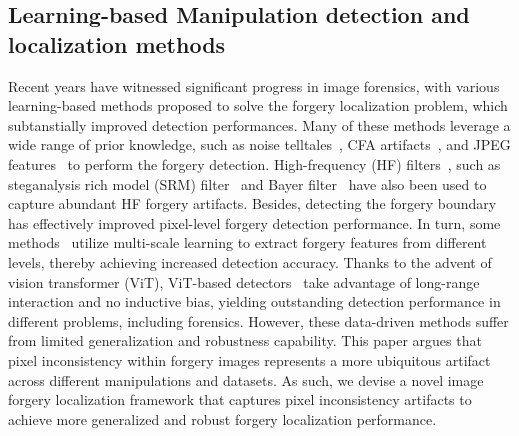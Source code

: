 \documentclass[10pt,journal,compsoc]{IEEEtran}
\begin{document}
\subsection{Learning-based Manipulation detection and localization methods}
Recent years have witnessed significant progress in image forensics, with various learning-based methods proposed to solve the forgery localization problem, which subtanstially improved detection performances. Many of these methods leverage a wide range of prior knowledge, such as noise telltales~\cite{cozzolino2019noiseprint, guillaro2022trufor, zhou2018learning}, CFA artifacts~\cite{bammey2020adaptive}, and JPEG features~\cite{kwon2022learning, rao2022towards, wang2022jpeg} to perform the forgery detection. High-frequency (HF) filters~\cite{zhuo2022self, li2019localization}, such as steganalysis rich
model (SRM) filter~\cite{zhou2018learning, wu2019mantra} and Bayer filter~\cite{dong2022mvss, wu2019mantra} have also been used to capture abundant HF forgery artifacts. Besides, detecting the forgery boundary~\cite{dong2022mvss, salloum2018image} has effectively improved pixel-level forgery detection performance. In turn, some methods~\cite{dong2022mvss, liu2022pscc, gao2022generic, ferreira2016behavior, luo2023beyond} utilize multi-scale learning to extract forgery features from different levels, thereby achieving increased detection accuracy. Thanks to the advent of vision transformer (ViT), ViT-based detectors~\cite{wang2022objectformer, lin2023image, yu2023msvt} take advantage of long-range interaction and no inductive bias, yielding outstanding detection performance in different problems, including forensics. However, these data-driven methods suffer from limited generalization and robustness capability.
This paper argues that pixel inconsistency within forgery images represents a more ubiquitous artifact across different manipulations and datasets. As such, we devise a novel image forgery localization framework that captures pixel inconsistency artifacts to achieve more generalized and robust forgery localization performance.
\end{document}
